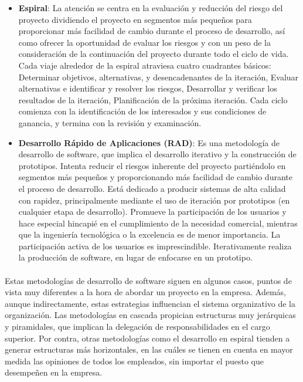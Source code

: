 \documentclass[12pt, a4paper]{report}
\begin{document}
\begin{itemize}
				\item \textbf{Espiral}: La atención se centra en la evaluación y reducción del riesgo del proyecto dividiendo el proyecto en segmentos más pequeños para proporcionar más facilidad de cambio durante el proceso de desarrollo, así como ofrecer la oportunidad de evaluar los riesgos y con un peso de la consideración de la continuación del proyecto durante todo el ciclo de vida. Cada viaje alrededor de la espiral atraviesa cuatro cuadrantes básicos: Determinar objetivos, alternativas, y desencadenantes de la iteración, Evaluar alternativas e identificar y resolver los riesgos, Desarrollar y verificar los resultados de la iteración, Planificación de la próxima iteración. Cada ciclo comienza con la identificación de los interesados y sus condiciones de ganancia, y termina con la revisión y examinación. \cite{wikipedia:metodologias}

				\item \textbf{Desarrollo Rápido de Aplicaciones (RAD)}: Es una metodología de desarrollo de software, que implica el desarrollo iterativo y la construcción de prototipos. Intenta reducir el riesgos inherente del proyecto partiéndolo en segmentos más pequeños y proporcionando más facilidad de cambio durante el proceso de desarrollo. Está dedicado a producir sistemas de alta calidad con rapidez, principalmente mediante el uso de iteración por prototipos (en cualquier etapa de desarrollo). Promueve la participación de los usuarios y hace especial hincapié en el cumplimiento de la necesidad comercial, mientras que la ingeniería tecnológica o la excelencia es de menor importancia. La participación activa de los usuarios es imprescindible. Iterativamente realiza la producción de software, en lugar de enfocarse en un prototipo. \cite{wikipedia:metodologias}

			\end{itemize}
            
            \paragraph{}
            Estas metodologías de desarrollo de software siguen en algunos casos, puntos de vista muy diferentes a la hora de abordar un proyecto en la empresa. Además, aunque indirectamente, estas estrategias influencian el sistema organizativo de la organización. Las metodologías en cascada propician estructuras muy jerárquicas y piramidales, que implican la delegación de responsabilidades en el cargo superior. Por contra, otras metodologías como el desarrollo en espiral tienden a generar estructuras más horizontales, en las cuáles se tienen en cuenta en mayor medida las opiniones de todos los empleados, sin importar el puesto que desempeñen en la empresa. 
            
\end{document}
